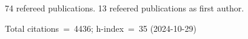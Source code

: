 74 refereed publications. 13 refeered publications as first author.

Total citations~=~4436; h-index~=~35 (2024-10-29)